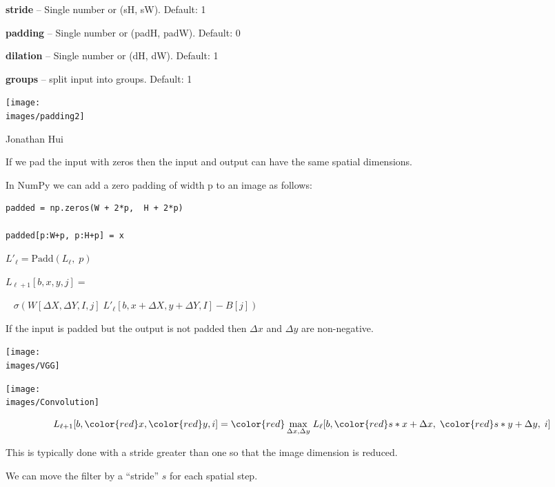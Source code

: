 {\medskip
{\bf stride} – Single number or (sH, sW). Default: 1

\medskip
{\bf padding} – Single number or (padH, padW). Default: 0

\medskip
{\bf dilation} – Single number or (dH, dW). Default: 1

\medskip
{\bf groups} – split input into groups. Default: 1


\centerline{\texttt{[image: \\images/padding2]}}
\centerline{\large Jonathan Hui}

\vfill
If we pad the input with zeros then the input and output can have the same spatial dimensions.


In NumPy we can add a zero padding of width p to an image as follows:

\vfill
\begin{verbatim}
padded = np.zeros(W + 2*p,  H + 2*p)

padded[p:W+p, p:H+p] = x
\end{verbatim}


$L'_{{\ell}} = \mathrm{Padd}(L_{{\ell}},\;p)$

\vfill
$L_{{\ell+1}}[b,x,y,j] =$

\vfill
$\;\;\;\sigma\left(W[\Delta X, \Delta Y, I,j]\;L'_{{\ell}}[b,x + \Delta X, y + \Delta Y, I] - B[j] \right)$

\vfill
If the input is padded but the output is not padded then $\Delta x$ and $\Delta y$ are non-negative.


\centerline{\texttt{[image: \\images/VGG]}}



\centerline{\texttt{[image: \\images/Convolution]}}

\vfill
$$L_{{\ell+1}}[b,{\color{red}x},{\color{red}y},i] = {\color{red} \max_{\Delta x, \Delta y}}\; L_{{\ell}}[b,{\color{red} s*x} + \Delta x,\; {\color{red} s*y} + \Delta y,\; i]$$

\vfill
This is typically done with a stride greater than one so that the image dimension is reduced.


We can move the filter by a ``stride'' $s$ for each spatial step.

}
